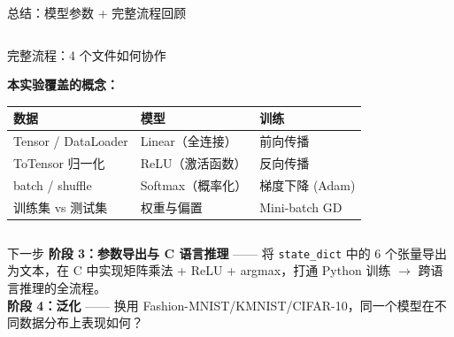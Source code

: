 \documentclass[aspectratio=169]{ctexbeamer}
\begin{document}
\begin{frame}[shrink=22]{总结：模型参数 + 完整流程回顾}
\begin{columns}[T]
\begin{block}{完整流程：4 个文件如何协作}
\vspace{0.15cm}

\textbf{本实验覆盖的概念：}\\[2pt]
\begin{tabular}{lll}
\toprule
\textbf{数据} & \textbf{模型} & \textbf{训练} \\
\midrule
Tensor / DataLoader & Linear（全连接） & 前向传播 \\
ToTensor 归一化   & ReLU（激活函数） & 反向传播 \\
batch / shuffle    & Softmax（概率化） & 梯度下降 (Adam) \\
训练集 vs 测试集   & 权重与偏置      & Mini-batch GD \\
\bottomrule
\end{tabular}
\end{block}
\end{columns}

\vspace{0.15cm}

\begin{alertblock}{下一步}
\footnotesize
\textbf{阶段 3：参数导出与 C 语言推理} —— 将 \texttt{state\_dict} 中的 6 个张量导出为文本，在 C 中实现矩阵乘法 + ReLU + argmax，打通 Python 训练 $\to$ 跨语言推理的全流程。\\
\textbf{阶段 4：泛化} —— 换用 Fashion-MNIST/KMNIST/CIFAR-10，同一个模型在不同数据分布上表现如何？
\end{alertblock}
\end{frame}

\end{document}
